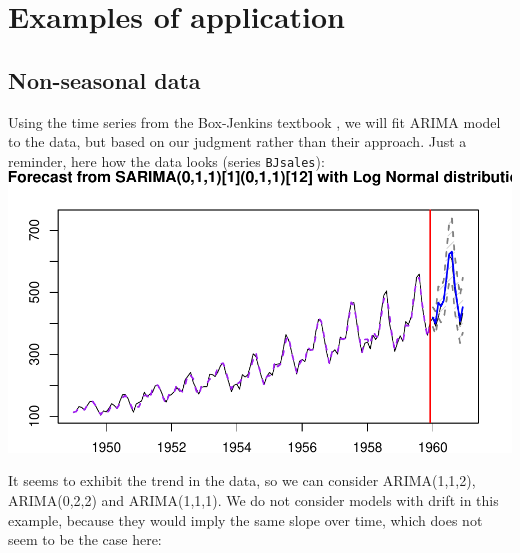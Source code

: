\documentclass[
]{book}
\theoremstyle{definition}
\theoremstyle{definition}
\theoremstyle{definition}
\theoremstyle{definition}
\theoremstyle{remark}
\begin{document}
\hypertarget{ARIMAExampleInR}{%
\section{Examples of application}\label{ARIMAExampleInR}}

\hypertarget{non-seasonal-data-2}{%
\subsection{Non-seasonal data}\label{non-seasonal-data-2}}

Using the time series from the Box-Jenkins textbook \citep{Box1976}, we will fit ARIMA model to the data, but based on our judgment rather than their approach. Just a reminder, here how the data looks (series \texttt{BJsales}):
\includegraphics{adam_files/figure-latex/unnamed-chunk-64-1.pdf}

It seems to exhibit the trend in the data, so we can consider ARIMA(1,1,2), ARIMA(0,2,2) and ARIMA(1,1,1). We do not consider models with drift in this example, because they would imply the same slope over time, which does not seem to be the case here:
\end{document}

